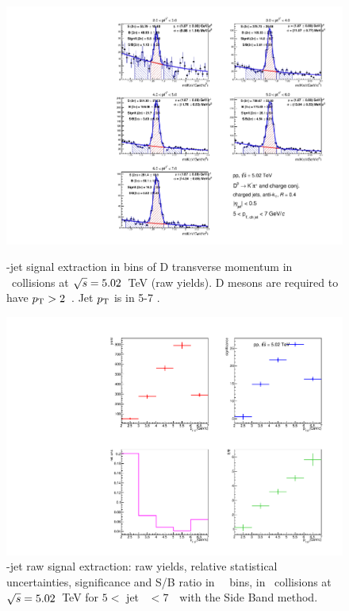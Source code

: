 \begin{figure}[bth]
\centering
\begin{minipage}{.65\textwidth}
  \centering
\includegraphics[width=\textwidth]{pp_2sig/R4_jetbin_5_7/invMass_pTD2}
\caption{\Dzero-jet signal extraction in bins of D transverse momentum in \pp\ collisions at $\sqrt{s}=5.02$~TeV (raw yields). D mesons are required to have $p_{\rm T}>2$~\GeVc. Jet $p_{\rm T}$ is in 5-7 \GeVc.
}
\label{fig:eq_pp_InvMass_Dzero_5_7_R4}
\end{minipage}%
\begin{minipage}{.4\textwidth}
  \centering
\includegraphics[width=\textwidth]{pp_2sig/R4_jetbin_5_7/signalParams_pTD2}
\caption{%
\Dzero-jet raw signal extraction: raw yields, relative statistical uncertainties, significance and S/B ratio in \Dzero\ \pt\ bins, in \pp\ collisions at $\sqrt{s}=5.02$~TeV for $5<$ jet \pt\ $<7$~\GeVc\ with the Side Band method.
}
\label{fig:eq_pp_signalParams_5_7_R4}
\end{minipage}
\end{figure}
